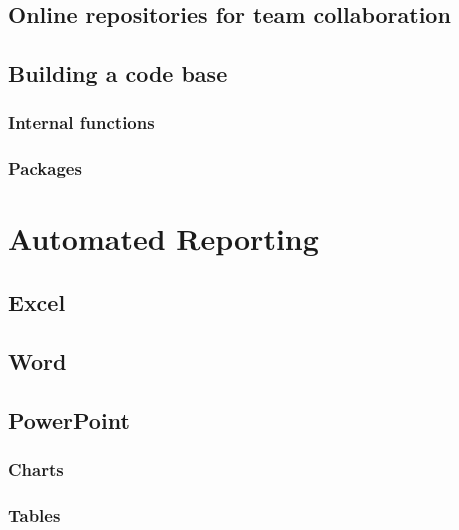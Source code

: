\documentclass[
]{book}
\begin{document}
\hypertarget{online-repositories-for-team-collaboration}{%
\section{Online repositories for team collaboration}\label{online-repositories-for-team-collaboration}}

\hypertarget{building-a-code-base}{%
\section{Building a code base}\label{building-a-code-base}}

\hypertarget{internal-functions}{%
\subsection{Internal functions}\label{internal-functions}}

\hypertarget{packages}{%
\subsection{Packages}\label{packages}}

\hypertarget{auto_report}{%
\chapter{Automated Reporting}\label{auto_report}}

\hypertarget{excel}{%
\section{Excel}\label{excel}}

\hypertarget{word}{%
\section{Word}\label{word}}

\hypertarget{powerpoint}{%
\section{PowerPoint}\label{powerpoint}}

\hypertarget{charts}{%
\subsection{Charts}\label{charts}}

\hypertarget{tables}{%
\subsection{Tables}\label{tables}}
\end{document}
